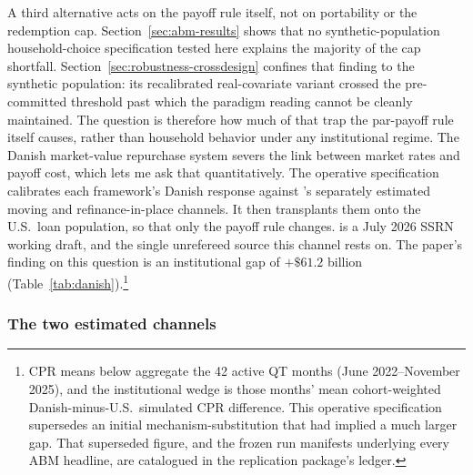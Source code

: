 \documentclass[12pt]{article}
\begin{document}
A third alternative acts on the payoff rule itself, not on portability or the redemption cap. Section~\ref{sec:abm-results} shows that no synthetic-population household-choice specification tested here explains the majority of the cap shortfall. Section~\ref{sec:robustness-crossdesign} confines that finding to the synthetic population: its recalibrated real-covariate variant crossed the pre-committed threshold past which the paradigm reading cannot be cleanly maintained. The question is therefore how much of that trap the par-payoff rule itself causes, rather than household behavior under any institutional regime. The Danish market-value repurchase system severs the link between market rates and payoff cost, which lets me ask that quantitatively. The operative specification calibrates each framework's Danish response against \citet{berger2026}'s separately estimated moving and refinance-in-place channels. It then transplants them onto the U.S.\ loan population, so that only the payoff rule changes. \citet{berger2026} is a July 2026 SSRN working draft, and the single unrefereed source this channel rests on. The paper's finding on this question is an institutional gap of $+\$61.2$ billion (Table~\ref{tab:danish}).\footnote{\label{fn:manifest}CPR means below aggregate the 42 active QT months (June 2022--November 2025), and the institutional wedge is those months' mean cohort-weighted Danish-minus-U.S.\ simulated CPR difference. This operative specification supersedes an initial mechanism-substitution that had implied a much larger gap. That superseded figure, and the frozen run manifests underlying every ABM headline, are catalogued in the replication package's ledger.}

\subsubsection{The two estimated channels}
\end{document}
